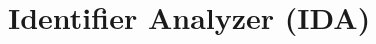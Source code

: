 \documentclass[a4paper,12pt]{report}
\begin{document}
%


%

%

%

\setcounter{chapter}{3}
\chapter{Identifier Analyzer (IDA)}


%


%
\end{document}
